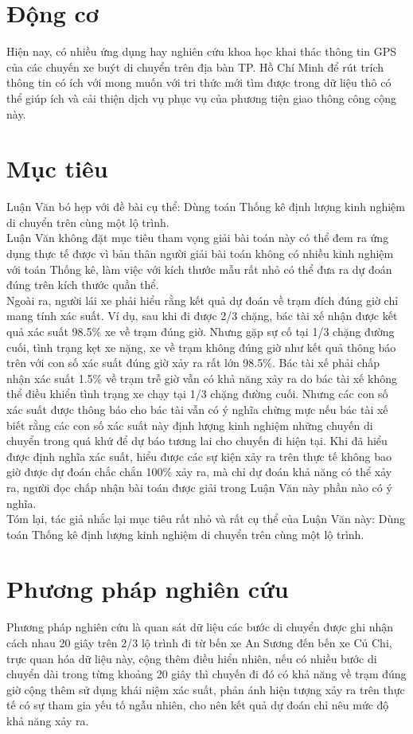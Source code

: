 \documentclass[a4paper, 13pt]{report}
\begin{document}
\section{Động cơ}
Hiện nay, có nhiều ứng dụng hay nghiên cứu khoa học khai thác thông tin GPS của các chuyến xe buýt di chuyển trên địa bàn TP. Hồ Chí Minh để rút trích thông tin có ích với mong muốn với tri thức mới tìm được trong dữ liệu thô có thể giúp ích và cải thiện dịch vụ phục vụ của phương tiện giao thông công cộng này.\\
\section{Mục tiêu}
Luận Văn bó hẹp với đề bài cụ thể: Dùng toán Thống kê định lượng kinh nghiệm di chuyển trên cùng một lộ trình.\\
Luận Văn không đặt mục tiêu tham vọng giải bài toán này có thể đem ra ứng dụng thực tế được vì bản thân người giải bài toán không có nhiều kinh nghiệm với toán Thống kê, làm việc với kích thước mẫu rất nhỏ có thể đưa ra dự đoán đúng trên kích thước quần thể.\\
Ngoài ra, người lái xe phải hiểu rằng kết quả dự đoán về trạm đích đúng giờ chỉ mang tính xác suất. Ví dụ, sau khi đi được 2/3 chặng, bác tài xế nhận được kết quả xác suất 98.5\% xe về trạm đúng giờ. Nhưng gặp sự cố tại 1/3 chặng đường cuối, tình trạng kẹt xe nặng, xe về trạm không đúng giờ như kết quả thông báo trên với con số xác suất đúng giờ xảy ra rất lớn 98.5\%. Bác tài xế phải chấp nhận xác suất 1.5\% về trạm trễ giờ vẫn có khả năng xảy ra do bác tài xế không thể điều khiển tình trạng xe chạy tại 1/3 chặng đường cuối. Nhưng các con số xác suất được thông báo cho bác tài vẫn có ý nghĩa chừng mực nếu bác tài xế biết rằng các con số xác suất này định lượng kinh nghiệm những chuyến di chuyển trong quá khứ để dự báo tương lai cho chuyến đi hiện tại. Khi đã hiểu được định nghĩa xác suất, hiểu được các sự kiện xảy ra trên thực tế không bao giờ được dự đoán chắc chắn 100\% xảy ra, mà chỉ dự đoán khả năng có thể xảy ra, người đọc chấp nhận bài toán được giải trong Luận Văn này phần nào có ý nghĩa.\\
Tóm lại, tác giả nhắc lại mục tiêu rất nhỏ và rất cụ thể của Luận Văn này: Dùng toán Thống kê định lượng kinh nghiệm di chuyển trên cùng một lộ trình.
\section{Phương pháp nghiên cứu}
Phương pháp nghiên cứu là quan sát dữ liệu các bước di chuyển được ghi nhận cách nhau 20 giây trên 2/3 lộ trình đi từ bến xe An Sương đến bến xe Củ Chi, trực quan hóa dữ liệu này, cộng thêm điều hiển nhiên, nếu có nhiều bước di chuyển dài trong từng khoảng 20 giây thì chuyến đi đó có khả năng về trạm đúng giờ cộng thêm sử dụng khái niệm xác suất, phản ánh hiện tượng xảy ra trên thực tế có sự tham gia yếu tố ngẫu nhiên, cho nên kết quả dự đoán chỉ nêu mức độ khả năng xảy ra.      
\end{document}
